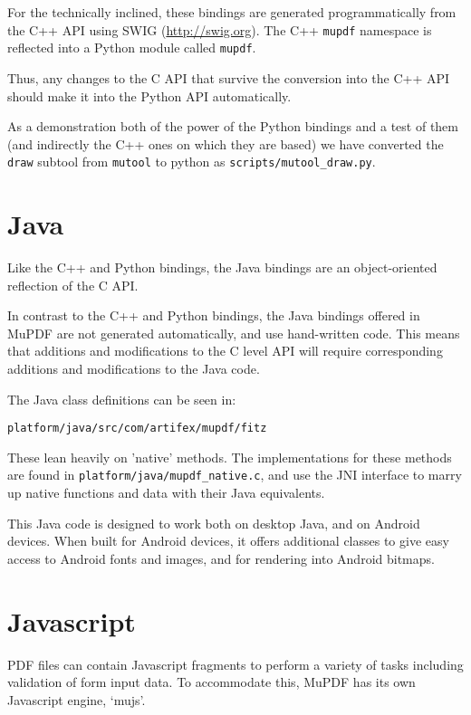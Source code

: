 \documentclass[oneside]{book}
\begin{document}
For the technically inclined, these bindings are generated programmatically from the C++ API using SWIG (\url{http://swig.org}). The C++ \texttt{mupdf} namespace is reflected into a Python module called \texttt{mupdf}.

Thus, any changes to the C API that survive the conversion into the C++ API should make it into the Python API automatically.

As a demonstration both of the power of the Python bindings and a test of them (and indirectly the C++ ones on which they are based) we have converted the \texttt{draw} subtool from \texttt{mutool} to python as \texttt{scripts/mutool\_draw.py}.

\section{Java}

Like the C++ and Python bindings, the Java bindings are an object-oriented reflection of the C API.

In contrast to the C++ and Python bindings, the Java bindings offered in MuPDF are not generated automatically, and use hand-written code. This means that additions and modifications to the C level API will require corresponding additions and modifications to the Java code.

The Java class definitions can be seen in:

\begin{lstlisting}
platform/java/src/com/artifex/mupdf/fitz
\end{lstlisting}

These lean heavily on 'native' methods. The implementations for these methods are found in \texttt{platform/java/mupdf\_native.c}, and use the JNI interface to marry up native functions and data with their Java equivalents.

This Java code is designed to work both on desktop Java, and on Android devices. When built for Android devices, it offers additional classes to give easy access to Android fonts and images, and for rendering into Android bitmaps.

\section{Javascript}

PDF files can contain Javascript fragments to perform a variety of tasks including validation of form input data. To accommodate this, MuPDF has its own Javascript engine, `mujs'.
\end{document}
